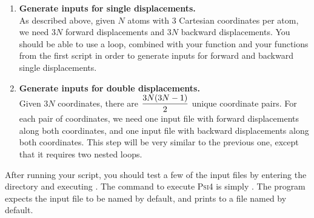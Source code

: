 \documentclass[11pt]{article}
\begin{document}
\begin{enumerate}[label=\textbf{\arabic*}]
\begin{addmargin}{2cm}{}
\begin{lstlisting}[language=python]
from molecule import *
make_input("x0x0_00",get_labels(),get_xyz())
\end{lstlisting}
\end{addmargin}
where the string  identifies the directory for the reference
configuration in my naming scheme,  is my function to return
labels (which lives in a script I have called ), and
 is my function to return a vector of coordinates (also in
).
\item {\bf Generate inputs for single displacements.}\\
As described above, given $N$ atoms with $3$ Cartesian coordinates per atom, we
need $3N$ forward displacements and $3N$ backward displacements. You should be
able to use a  loop, combined with your  function
and your functions from the first script in order to generate inputs for
forward and backward single displacements.
\item {\bf Generate inputs for double displacements.}\\
Given $3N$ coordinates, there are $\dfrac{3N(3N-1)}{2}$ unique coordinate pairs.
For each pair of coordinates, we need one input file with forward displacements
along both coordinates, and one input file with backward displacements along
both coordinates. This step will be very similar to the previous one, except
that it requires two nested  loops.
\end{enumerate}
After running your script, you should test a few of the input files by entering
the directory and executing .  The command to execute \textsc{Psi4}
is simply .  The program expects the input file to be named
 by default, and prints to a file named  by
default.
\end{document}
